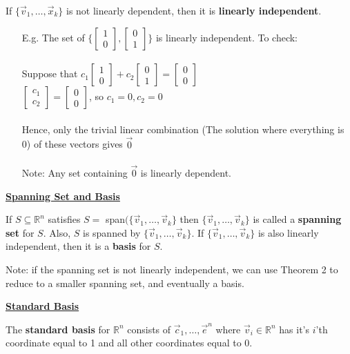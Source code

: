 \documentclass{letter}
\newcommand{\m}{\begin{bmatrix}}
\newcommand{\mm}{\end{bmatrix}}
\newcommand{\0}[1]{\begin{bmatrix}#1\end{bmatrix}}
\newcommand{\h}[1]{\underline{\textbf{#1}}}
\begin{document}
	If $\{ \vec v_1, \dots, \vec x_k \}$ is not linearly dependent, then it is \textbf{linearly independent}.
	
	\begin{itemize}
		\item[E.g. ] The set of $\{ \m 1\\0\mm, \m0\\1\mm \}$ is linearly independent. To check:\\\\
		Suppose that $c_1\m1\\0\mm + c_2\m0\\1\mm = \m0\\0\mm$\\
		$\m c_1\\c_2 \mm = \m0\\0\mm$, so $c_1 = 0, c_2 = 0$\\\\
		Hence, only the trivial linear combination (The solution where everything is 0) of these vectors gives $\vec 0$\\\\
		Note: Any set containing $\vec 0$ is linearly dependent.
	\end{itemize}
	
	\clearpage
	
	\h{Spanning Set and Basis}
	
	If $S \subseteq \mathbb{R}^n$ satisfies $S =$ span$(\{ \vec v_1, \dots, \vec v_k \}$ then $\{ \vec v_1, \dots, \vec v_k \}$ is called a \textbf{spanning set} for $S$. Also, $S$ is spanned by $\{ \vec v_1, \dots, \vec v_k \}$. If $\{ \vec v_1, \dots, \vec v_k \}$ is also linearly independent, then it is a \textbf{basis} for $S$.
	
	Note: if the spanning set is not linearly independent, we can use Theorem 2 to reduce to a smaller spanning set, and eventually a basis.
	
	\h{Standard Basis}
	
	The \textbf{standard basis} for $\mathbb{R}^n$ consists of $\vec c_1, \dots, \vec e^n$ where $\vec v_i \in \mathbb{R}^n$ has it's $i$'th coordinate equal to 1 and all other coordinates equal to 0.
	
\end{document}
